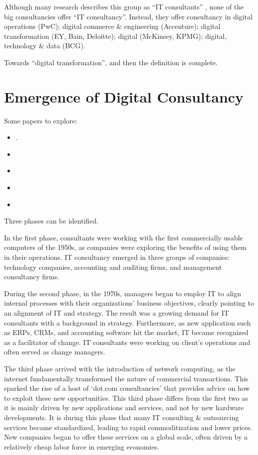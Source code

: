 \documentclass[12pt]{article}
\providecommand{\tightlist}{%
  \setlength{\itemsep}{0pt}\setlength{\parskip}{0pt}}
\begin{document}
Although many research describes this group as ``IT consultants''
\citep{nevo2007, loh1992, fincham2006, armbruster2006, bloomfield1995, schwarz2005},
none of the big consultancies offer ``IT consultancy''. Instead, they
offer consultancy in digital operations (PwC); digital commerce \&
engineering (Accenture); digital transformation (EY, Bain, Deloitte);
digital (McKinsey, KPMG); digital, technology \& data (BCG).

Towards ``digital transformation'', and then the definition is complete.

\hypertarget{emergence-of-digital-consultancy}{%
\section{Emergence of Digital
Consultancy}\label{emergence-of-digital-consultancy}}

Some papers to explore:

\begin{itemize}
\tightlist
\item
  \citep[ 120-130]{armbruster2006}.
\item
  \citep{kipping2003}
\item
  \citep{kipping2012}
\item
  \citep[ 336]{fincham1999}
\item
  \citep{mckenna2006}
\end{itemize}

Three phases can be identified.

In the first phase, consultants were working with the first commercially
usable computers of the 1950s, as companies were exploring the benefits
of using them in their operations. IT consultancy emerged in three
groups of companies: technology companies, accounting and auditing
firms, and management consultancy firms. \citep[ 162]{kipping2012}

During the second phase, in the 1970s, managers began to employ IT to
align internal processes with their organizations' business objectives,
clearly pointing to an alignment of IT and strategy. The result was a
growing demand for IT consultants with a background in strategy.
Furthermore, as new application such as ERPs, CRMs, and accounting
software hit the market, IT became recognized as a facilitator of
change. IT consultants were working on client's operations and often
served as change managers.

The third phase arrived with the introduction of network computing, as
the internet fundamentally transformed the nature of commercial
transactions. This sparked the rise of a host of `dot.com consultancies'
that provides advice on how to exploit these new opportunities. This
third phase differs from the first two as it is mainly driven by new
applications and services, and not by new hardware developments. It is
during this phase that many IT consulting \& outsourcing services became
standardized, leading to rapid commoditization and lower prices. New
companies began to offer these services on a global scale, often driven
by a relatively cheap labor force in emerging economies.
\end{document}
